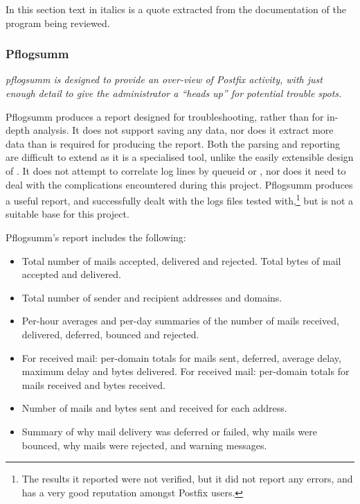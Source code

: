 In this section text in italics is a quote extracted from the documentation
of the program being reviewed.


\subsubsection{Pflogsumm}

\textit{pflogsumm is designed to provide an over-view of Postfix activity,
with just enough detail to give the administrator a ``heads up'' for
potential trouble spots.\/}

Pflogsumm produces a report designed for troubleshooting, rather than for
in-depth analysis.  It does not support saving any data, nor does it
extract more data than is required for producing the report.  Both the
parsing and reporting are difficult to extend as it is a specialised tool,
unlike the easily extensible design of \parsername{}.  It does not attempt
to correlate log lines by queueid or \pid{}, nor does it need to deal with
the complications encountered during this project.  Pflogsumm produces a
useful report, and successfully dealt with the \numberOFlogFILES{} logs
files tested with,\footnote{The results it reported were not verified, but
it did not report any errors, and has a very good reputation amongst
Postfix users.} but is not a suitable base for this project.

Pflogsumm's report includes the following:

\begin{itemize}

    \item Total number of mails accepted, delivered and rejected.  Total
        bytes of mail accepted and delivered.

    \item Total number of sender and recipient addresses and domains.

    \item Per-hour averages and per-day summaries of the number of mails
        received, delivered, deferred, bounced and rejected.

    \item For received mail: per-domain totals for mails sent, deferred,
        average delay, maximum delay and bytes delivered.  For received
        mail: per-domain totals for mails received and bytes received.

    \item Number of mails and bytes sent and received for each address.

    \item Summary of why mail delivery was deferred or failed, why mails
        were bounced, why mails were rejected, and warning messages.

\end{itemize}

